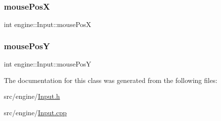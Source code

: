 \subsubsection{\texorpdfstring{mouse\+PosX}{mousePosX}}
{\footnotesize\ttfamily int engine\+::\+Input\+::mouse\+PosX\hspace{0.3cm}{\ttfamily [private]}}

\mbox{\label{classengine_1_1_input_a1db046321740828b8f90dd31014c779c}} 
\subsubsection{\texorpdfstring{mouse\+PosY}{mousePosY}}
{\footnotesize\ttfamily int engine\+::\+Input\+::mouse\+PosY\hspace{0.3cm}{\ttfamily [private]}}



The documentation for this class was generated from the following files\+:\begin{DoxyCompactItemize}
\item 
src/engine/\mbox{\hyperlink{_input_8h}{Input.\+h}}\item 
src/engine/\mbox{\hyperlink{_input_8cpp}{Input.\+cpp}}\end{DoxyCompactItemize}
